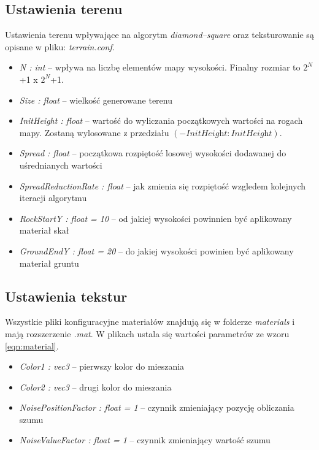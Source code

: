 \documentclass[inz,longabstract]{iithesis}
\begin{document}
        \subsection{Ustawienia terenu}
        Ustawienia terenu wpływające na algorytm \textit{diamond--square} oraz teksturowanie są opisane w pliku: \textit{terrain.conf}.
        \begin{itemize}
            \item \textit{N : int} -- wpływa na liczbę elementów mapy wysokości. Finalny rozmiar to $2^N$+1 x $2^N$+1.
            \item \textit{Size : float} -- wielkość generowane terenu 
            \item \textit{InitHeight : float} -- wartość do wyliczania początkowych wartości na rogach mapy. Zostaną wylosowane z przedziału $(-\textit{InitHeight}:\textit{InitHeight})$.
            \item \textit{Spread : float} -- początkowa rozpiętość losowej wysokości dodawanej do uśrednianych wartości
            \item \textit{SpreadReductionRate : float} -- jak zmienia się rozpiętość wzgledem kolejnych iteracji algorytmu 
            \item \textit{RockStartY : float = 10} -- od jakiej wysokości powinnien być aplikowany materiał skał
            \item \textit{GroundEndY : float = 20} -- do jakiej wysokości powinien być aplikowany materiał gruntu
        \end{itemize}
        
        \subsection{Ustawienia tekstur}
        Wszystkie pliki konfiguracyjne materiałów znajdują się w folderze \textit{materials} i mają rozszerzenie \textit{.mat}. W plikach ustala się wartości parametrów ze wzoru \ref{eqn:material}. 
        \begin{itemize}
            \item \textit{Color1 : vec3} -- pierwszy kolor do mieszania
            \item \textit{Color2 : vec3} -- drugi kolor do mieszania
            \item \textit{NoisePositionFactor : float = 1} -- czynnik zmieniający pozycję obliczania szumu 
            \item \textit{NoiseValueFactor : float = 1} -- czynnik zmieniający wartość szumu
        \end{itemize}
        
\end{document}
